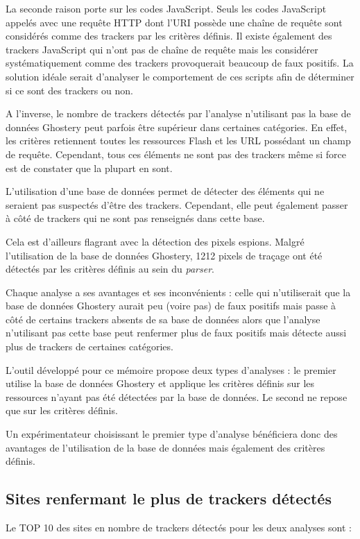 La seconde raison porte sur les codes JavaScript. Seuls les codes JavaScript appelés avec une requête HTTP dont l'URI possède une chaîne de requête sont considérés comme des trackers par les critères définis. Il existe également des trackers JavaScript qui n'ont pas de chaîne de requête mais les considérer systématiquement comme des trackers provoquerait beaucoup de faux positifs. La solution idéale serait d'analyser le comportement de ces scripts afin de déterminer si ce sont des trackers ou non.
\newline

A l'inverse, le nombre de trackers détectés par l'analyse n'utilisant pas la base de données Ghostery peut parfois être supérieur dans certaines catégories. En effet, les critères retiennent toutes les ressources Flash et les URL possédant un champ de requête. Cependant, tous ces éléments ne sont pas des trackers même si force est de constater que la plupart en sont.
\newline

L'utilisation d'une base de données permet de détecter des éléments qui ne seraient pas suspectés d'être des trackers. Cependant, elle peut également passer à côté de trackers qui ne sont pas renseignés dans cette base.

Cela est d'ailleurs flagrant avec la détection des pixels espions. Malgré l'utilisation de la base de données Ghostery, 1212 pixels de traçage ont été détectés par les critères définis au sein du \textit{parser}.
\newline

Chaque analyse a ses avantages et ses inconvénients : celle qui n'utiliserait que la base de données Ghostery aurait peu (voire pas) de faux positifs mais passe à côté de certains trackers absents de sa base de données alors que l'analyse n'utilisant pas cette base peut renfermer plus de faux positifs mais détecte aussi plus de trackers de certaines catégories.
\newline

L'outil développé pour ce mémoire propose deux types d'analyses : le premier utilise la base de données Ghostery et applique les critères définis sur les ressources n'ayant pas été détectées par la base de données. Le second ne repose que sur les critères définis.

Un expérimentateur choisissant le premier type d'analyse bénéficiera donc des avantages de l'utilisation de la base de données mais également des critères définis.
\newpage

\subsection{Sites renfermant le plus de trackers détectés}
Le TOP 10 des sites en nombre de trackers détectés pour les deux analyses sont :\\

